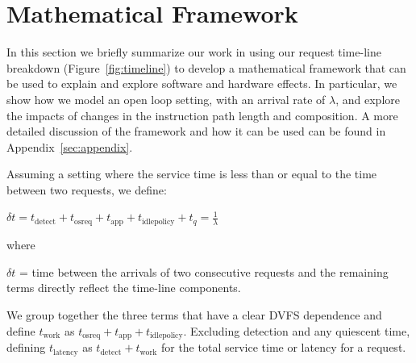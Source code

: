 
\section{Mathematical Framework}
\label{sec:model}

In this section we briefly summarize our work in using our request time-line breakdown (Figure~\ref{fig:timeline}) to develop a mathematical framework that can be used to explain and explore software and hardware effects.  In particular, we show how we model an open loop setting, with an arrival rate of $\lambda$, and explore the impacts of changes in the instruction path length and composition.  A more detailed discussion of the framework and how it can be used can be found in Appendix~\ref{sec:appendix}.   

Assuming a setting where the service time is less than or equal to the time between two requests, we define:

$\boxed{\delta t = t_{\text{detect}} + t_{\text{osreq}} + t_{\text{app}} + t_{\text{idlepolicy}} + t_q} = \frac{1}{\lambda}$

where 

$\delta t$ = time between the arrivals of two consecutive requests and the remaining terms directly reflect the time-line components.  

We group together the three terms that have a clear DVFS dependence and define
$t_{\text{work}}$ as $t_{\text{osreq}} + t_{\text{app}} + t_{\text{idlepolicy}}$.  Excluding detection and any quiescent time, defining $t_{\text{latency}}$ as $t_{\text{detect}} + t_{\text{work}}$ for the total service time or latency for a request.

